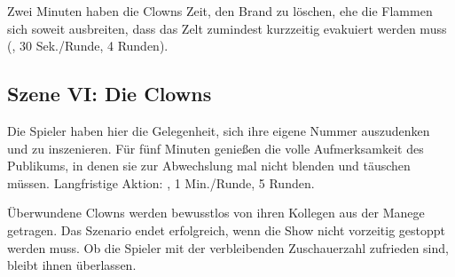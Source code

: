 {		Zwei Minuten haben die Clowns Zeit, den Brand zu löschen, ehe die Flammen sich soweit ausbreiten, dass das Zelt zumindest kurzzeitig evakuiert werden muss (, 30 Sek./Runde, 4 Runden).

		\subsection{Szene VI: Die Clowns}

		Die Spieler haben hier die Gelegenheit, sich ihre eigene Nummer auszudenken und zu inszenieren. Für fünf Minuten genießen die volle Aufmerksamkeit des Publikums, in denen sie zur Abwechslung mal nicht blenden und täuschen müssen. Langfristige Aktion: , 1 Min./Runde, 5 Runden.


		\noindent
		Überwundene Clowns werden bewusstlos von ihren Kollegen aus der Manege getragen. Das Szenario endet erfolgreich, wenn die Show nicht vorzeitig gestoppt werden muss. Ob die Spieler mit der verbleibenden Zuschauerzahl zufrieden sind, bleibt ihnen überlassen.

}

